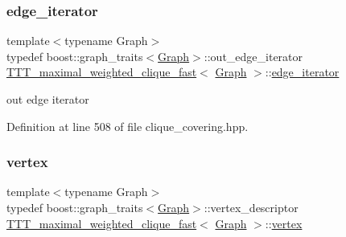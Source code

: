 \mbox{\label{classTTT__maximal__weighted__clique__fast_aa93d46889f2c32b755cfe6fb8f05e1df}} 
\subsubsection{\texorpdfstring{edge\+\_\+iterator}{edge\_iterator}}
{\footnotesize\ttfamily template$<$typename Graph$>$ \\
typedef boost\+::graph\+\_\+traits$<$\hyperlink{structGraph}{Graph}$>$\+::out\+\_\+edge\+\_\+iterator \hyperlink{classTTT__maximal__weighted__clique__fast}{T\+T\+T\+\_\+maximal\+\_\+weighted\+\_\+clique\+\_\+fast}$<$ \hyperlink{structGraph}{Graph} $>$\+::\hyperlink{classTTT__maximal__weighted__clique__fast_aa93d46889f2c32b755cfe6fb8f05e1df}{edge\+\_\+iterator}\hspace{0.3cm}{\ttfamily [private]}}



out edge iterator 



Definition at line 508 of file clique\+\_\+covering.\+hpp.

\mbox{\label{classTTT__maximal__weighted__clique__fast_a55ca1f8931415f7338827925b86c218d}} 
\subsubsection{\texorpdfstring{vertex}{vertex}}
{\footnotesize\ttfamily template$<$typename Graph$>$ \\
typedef boost\+::graph\+\_\+traits$<$\hyperlink{structGraph}{Graph}$>$\+::vertex\+\_\+descriptor \hyperlink{classTTT__maximal__weighted__clique__fast}{T\+T\+T\+\_\+maximal\+\_\+weighted\+\_\+clique\+\_\+fast}$<$ \hyperlink{structGraph}{Graph} $>$\+::\hyperlink{classTTT__maximal__weighted__clique__fast_a55ca1f8931415f7338827925b86c218d}{vertex}\hspace{0.3cm}{\ttfamily [private]}}



